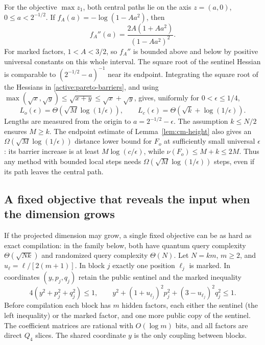 For the objective $\max z_1$, both central paths lie on the axis
$z=(a,0)$,
$0\leq a<2^{-1/2}$. If $f_A(a)=-\log(1-Aa^2)$, then
\[
 f_A''(a)=\frac{2A(1+Aa^2)}{(1-Aa^2)^2}.
\]
For marked factors, $1<A<3/2$, so $f_A''$ is bounded above
and below by positive universal constants on this whole interval.
The square root of the sentinel Hessian is comparable to
$(2^{-1/2}-a)^{-1}$ near its endpoint. Integrating the square
root of the Hessians in \eqref{active:pareto-barriers}, and using
$\max(\sqrt x,\sqrt y)\leq\sqrt{x+y}\leq\sqrt x+\sqrt y$,
gives, uniformly for $0<\epsilon\leq1/4$,
\begin{equation}\label{active:pareto-lengths}
 L_o(\epsilon)=\Theta\!\left(\sqrt M\log(1/\epsilon)\right),\qquad
 L_c(\epsilon)=\Theta\!\left(\sqrt k+\log(1/\epsilon)\right).
\end{equation}
Lengths are measured from the origin to $a=2^{-1/2}-\epsilon$.
The assumption $k\leq N/2$ ensures $M\geq k$.
The endpoint estimate of Lemma~\ref{lem:cm-height} also gives
an $\Omega(\sqrt M\log(1/\epsilon))$ distance lower bound for
$F_o$ at sufficiently small universal $\epsilon$: its barrier
increase is at least $M\log(c/\epsilon)$, while
$\nu(F_o)\leq M+k\leq2M$. Thus any method with bounded local steps needs
$\Omega(\sqrt M\log(1/\epsilon))$ steps, even if its path leaves the
central path.

\subsection{A fixed objective that reveals the input when the dimension grows}

If the projected dimension may grow, a single fixed objective can be
as hard as exact compilation: in the family below, both have quantum
query complexity $\Theta(\sqrt{Nk})$ and randomized query complexity
$\Theta(N)$. Let $N=km$,
$m\geq2$, and $u_\ell=\ell/[2(m+1)]$. In block $j$ exactly one
position $\ell_j$ is marked. In coordinates $(y,p_j,q_j)$ retain
the public sentinel and the marked inequality
\begin{equation}\label{active:growing-body}
 4(y^2+p_j^2+q_j^2)\leq1,\qquad
 y^2+(1+u_{\ell_j})^2p_j^2+(3-u_{\ell_j})^2q_j^2\leq1.
\end{equation}
Before compilation each block has $m$ hidden factors, each either the
sentinel (the left inequality) or the marked factor, and one more
public copy of the sentinel.
The coefficient matrices are rational with
$O(\log m)$ bits, and all factors are direct $Q_4$ slices.
The shared coordinate $y$ is the only coupling between blocks.


